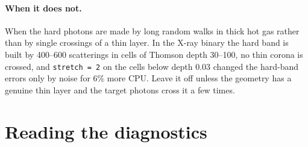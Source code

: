 \documentclass[11pt]{article}
\newcommand{\key}[1]{\texttt{#1}}
\begin{document}
\paragraph{When it does not.} When the hard photons are made by long random walks in
thick hot gas rather than by single crossings of a thin layer. In the X-ray binary the
hard band is built by 400--600 scatterings in cells of Thomson depth 30--100, no thin
corona is crossed, and \key{stretch = 2} on the cells below depth 0.03 changed the
hard-band errors only by noise for 6\% more CPU. Leave it off unless the geometry has a
genuine thin layer and the target photons cross it a few times.

\section{Reading the diagnostics}
\end{document}
